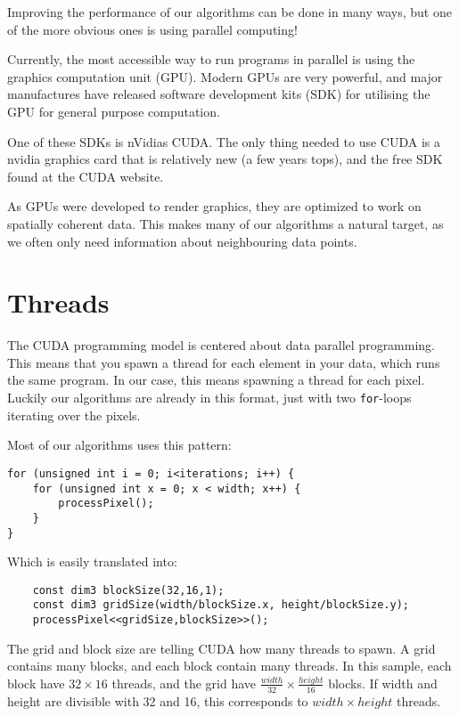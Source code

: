 
Improving the performance of our algorithms can be done in many ways,
but one of the more obvious ones is using parallel computing!

Currently, the most accessible way to run programs in parallel is
using the graphics computation unit (GPU). Modern GPUs are very
powerful, and major manufactures have released software development
kits (SDK) for utilising the GPU for general purpose computation.

One of these SDKs is nVidias CUDA. The only thing needed to
use CUDA is a nvidia graphics card that is relatively new (a few years
tops), and the free SDK found at the CUDA website.

As GPUs were developed to render graphics, they are optimized to work
on spatially coherent data. This makes many of our algorithms a
natural target, as we often only need information about neighbouring
data points.

\section{Threads}

The CUDA programming model is centered about data parallel
programming. This means that you spawn a thread for each element in
your data, which runs the same program. In our case, this means
spawning a thread for each pixel. Luckily our algorithms are already
in this format, just with two \texttt{for}-loops iterating over the pixels.

Most of our algorithms uses this pattern:

\begin{lstlisting}
for (unsigned int i = 0; i<iterations; i++) {
    for (unsigned int x = 0; x < width; x++) {
        processPixel();
    }
}
\end{lstlisting}

Which is easily translated into:
\begin{lstlisting}
    const dim3 blockSize(32,16,1);
    const dim3 gridSize(width/blockSize.x, height/blockSize.y);
    processPixel<<gridSize,blockSize>>();
\end{lstlisting}

The grid and block size are telling CUDA how many threads to
spawn. A grid contains many blocks, and each block contain many
threads. In this sample, each block have $32 \times 16$ threads, and
the grid have $\frac{width}{32} \times \frac{height}{16}$ blocks. If
width and height are divisible with 32 and 16, this corresponds to
$width \times height$ threads. 

